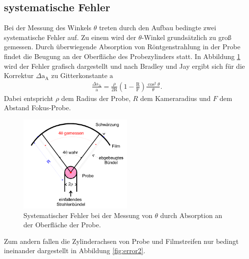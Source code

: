 \subsection{systematische Fehler}
Bei der Messung des Winkels $\theta$
treten durch den Aufbau bedingte zwei systematische Fehler auf.
Zu einem wird der $\theta$-Winkel grundsätzlich zu groß gemessen.
Durch überwiegende Absorption von Röntgenstrahlung in der Probe
findet die Beugung an der Oberfläche des
Probezylinders statt. In Abbildung \ref{fig:error1} wird
der Fehler grafisch dargestellt und nach Bradley und Jay
ergibt sich für die Korrektur
$\Delta \mathrm{a}_{\mathrm{A}}$
zu Gitterkonstante $\mathrm{a}$
\begin{align}
  \frac{\Delta \mathrm{a}_{\mathrm{A}}}{\mathrm{a}}=\frac{\rho}{2\mathrm{R}}\left(1-\frac{\mathrm{R}}{\mathrm{F}}\right)\frac{\cos^2\theta}{\theta}. \label{eqn:sys1}
\end{align}
Dabei entspricht $\rho$ dem Radius der Probe, $R$ dem Kameraradius
und $F$ dem Abstand Fokus-Probe.

 \begin{figure}
   \centering
   \includegraphics[width=0.5\textwidth]{Syst_error_1.PNG}
   \caption{Systematischer Fehler bei der Messung von $\theta$ durch
   Absorption an der Oberfläche der Probe.}
   \label{fig:error1}
  \end{figure}

Zum andern fallen die Zylinderachsen von Probe und Filmstreifen
nur bedingt ineinander dargestellt in Abbildung \ref{fig:error2}.

